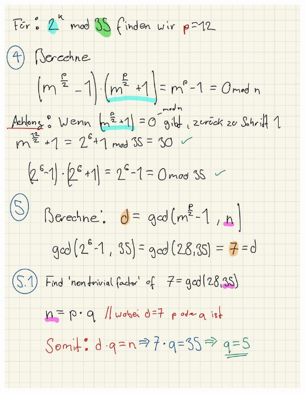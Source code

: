 \documentclass[11pt]{article}
\begin{document}
\begin{center}
	\includegraphics[scale=0.9]{img/shor2.jpg}\\
\end{center}



    
    
    
\end{document}
